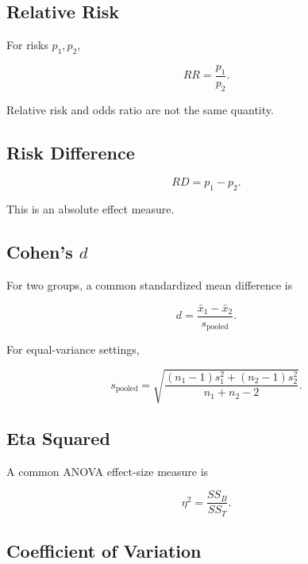 \subsection{Relative Risk}
\label{subsec:relative-risk-reference}

For risks \(p_1,p_2\),

\[
\boxed{
RR
=
\frac{
p_1
}{
p_2
}.
}
\]

Relative risk and odds ratio are not the same quantity.

\subsection{Risk Difference}
\label{subsec:risk-difference-reference}

\[
\boxed{
RD
=
p_1-p_2.
}
\]

This is an absolute effect measure.

\subsection{Cohen's \(d\)}
\label{subsec:cohens-d-reference}

For two groups, a common standardized mean difference is

\[
\boxed{
d
=
\frac{
\bar{x}_1-\bar{x}_2
}{
s_{\mathrm{pooled}}
}.
}
\]

For equal-variance settings,

\[
\boxed{
s_{\mathrm{pooled}}
=
\sqrt{
\frac{
(n_1-1)s_1^2
+
(n_2-1)s_2^2
}{
n_1+n_2-2
}
}.
}
\]

\subsection{Eta Squared}
\label{subsec:eta-squared-reference}

A common ANOVA effect-size measure is

\[
\boxed{
\eta^2
=
\frac{
SS_B
}{
SS_T
}.
}
\]

\subsection{Coefficient of Variation}
\label{subsec:coefficient-variation-reference}

